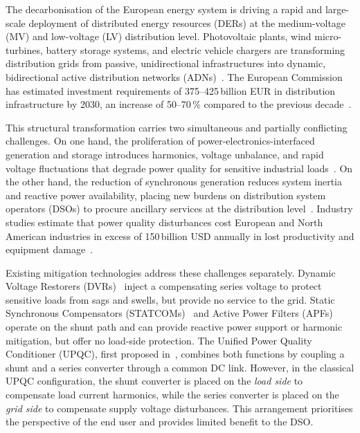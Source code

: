 \documentclass[conference]{IEEEtran}
\begin{document}
The decarbonisation of the European energy system is driving a rapid
and large-scale deployment of distributed energy resources (DERs)
at the medium-voltage (MV) and low-voltage (LV) distribution level.
Photovoltaic plants, wind micro-turbines, battery storage systems, and
electric vehicle chargers are transforming distribution grids from
passive, unidirectional infrastructures into dynamic, bidirectional
active distribution networks (ADNs)~\cite{ref:EDSO_transition}.
The European Commission has estimated investment requirements of
375--425\,billion EUR in distribution infrastructure by 2030, an
increase of 50--70\,\% compared to the previous decade~\cite{ref:EC_grids}.

This structural transformation carries two simultaneous and
partially conflicting challenges. On one hand, the proliferation of
power-electronics-interfaced generation and storage introduces
harmonics, voltage unbalance, and rapid voltage fluctuations that
degrade power quality for sensitive industrial loads~\cite{ref:IEEE_std_519}.
On the other hand, the reduction of synchronous generation reduces
system inertia and reactive power availability, placing new burdens
on distribution system operators (DSOs) to procure ancillary services
at the distribution level~\cite{ref:ancillary_EU}.
Industry studies estimate that power quality disturbances cost European
and North American industries in excess of 150\,billion USD annually in
lost productivity and equipment damage~\cite{ref:PQ_cost}.

Existing mitigation technologies address these challenges separately.
Dynamic Voltage Restorers (DVRs)~\cite{ref:DVR_original} inject a
compensating series voltage to protect sensitive loads from sags and
swells, but provide no service to the grid.
Static Synchronous Compensators (STATCOMs)~\cite{ref:STATCOM_ref} and
Active Power Filters (APFs)~\cite{ref:APF_ref} operate on the shunt
path and can provide reactive power support or harmonic mitigation,
but offer no load-side protection.
The Unified Power Quality Conditioner (UPQC), first proposed
in~\cite{ref:UPQC_original}, combines both functions by coupling a
shunt and a series converter through a common DC link.
However, in the classical UPQC configuration, the shunt converter is
placed on the \emph{load side} to compensate load current harmonics,
while the series converter is placed on the \emph{grid side} to
compensate supply voltage disturbances.
This arrangement prioritises the perspective of the end user and
provides limited benefit to the DSO.
\end{document}
